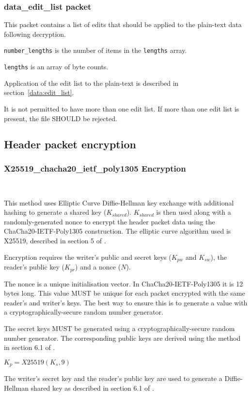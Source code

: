 \documentclass[10pt]{article}
\newcommand{\kw}[1]{\texttt{#1}}
\begin{document}
\subsubsection{data\_edit\_list packet}

This packet contains a list of edits that should be applied to the plain-text data following decryption.

\kw{number\_lengths} is the number of items in the \kw{lengths} array.

\kw{lengths} is an array of byte counts.

Application of the edit list to the plain-text is described in section~\ref{data:edit_list}.

It is not permitted to have more than one edit list.
If more than one edit list is present, the file SHOULD be rejected.

\subsection{Header packet encryption}

\subsubsection{X25519\_chacha20\_ietf\_poly1305 Encryption}~\label{header:X25519}

This method uses Elliptic Curve Diffie-Hellman key exchange with additional hashing to generate a shared
key ($K_{shared}$).
$K_{shared}$ is then used along with a randomly-generated nonce to encrypt the header packet data using the
ChaCha20-IETF-Poly1305 construction.
The elliptic curve algorithm used is X25519, described in section 5 of \cite{RFC7748}.

Encryption requires the writer's public and secret keys ($K_{pw}$ and $K_{sw}$), the reader's public key ($K_{pr}$)
and a nonce ($N$).

The nonce is a unique initialisation vector.
In ChaCha20-IETF-Poly1305 it is 12 bytes long.
This value MUST be unique for each packet encrypted with the same reader's and writer's keys.
The best way to ensure this is to generate a value with a cryptographically-secure random number generator.

The secret keys MUST be generated using a cryptographically-secure random number generator.
The corresponding public keys are derived using the method in section 6.1 of \cite{RFC7748}.

$K_p = X25519(K_s, 9)$

The writer's secret key and the reader's public key are used to generate a Diffie-Hellman shared key as described in
section 6.1 of \cite{RFC7748}.
\end{document}
